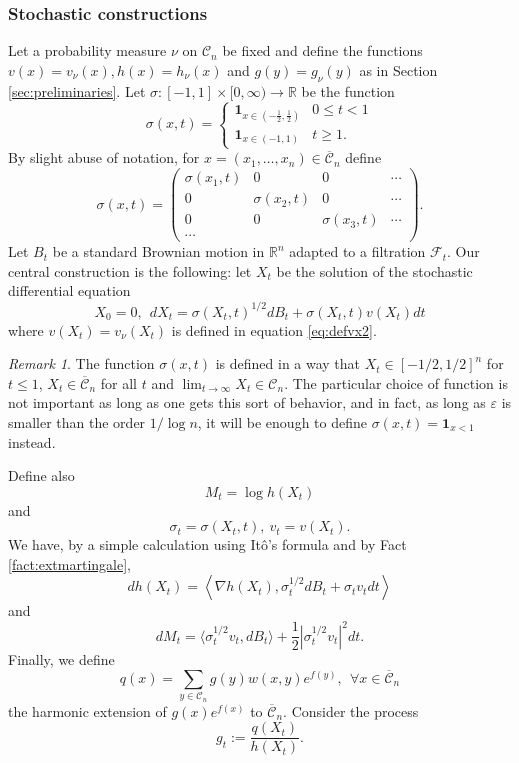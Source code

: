 \documentclass[12pt]{article}
\def \RR {\mathbb R}
\def \CC {\mathbb C}
\def \eps {\varepsilon}
\def \FF {\mathcal{F}}
\def \DC {\mathcal{C}_n}
\def \CC {\overline{\mathcal{C}}_n}
\theoremstyle{definition}
\theoremstyle{remark}
\newtheorem{remark}{Remark}
\begin{document}
\subsubsection{Stochastic constructions} \label{sec:stochastic}
Let a probability measure $\nu$ on $\DC$ be fixed and define the functions $v(x)=v_\nu(x),h(x)=h_\nu(x)$ and $g(y)=g_\nu(y)$ as in Section \ref{sec:preliminaries}. Let $\sigma:[-1,1] \times [0,\infty) \to \RR$ be the function 
$$
\sigma(x,t) = \begin{cases}
\mathbf{1}_{x \in \left (-\tfrac 1 2, \tfrac 1 2 \right )} & 0 \leq t < 1 \\
\mathbf{1}_{x \in (-1,1)} & t \geq 1.
\end{cases}
$$ 
By slight abuse of notation, for $x = (x_1, \dots, x_n) \in \CC$ define 
$$
\sigma(x,t) = \left (\begin{matrix}
\sigma(x_1,t) & 0 & 0 & \cdots \\
0 & \sigma(x_2,t) & 0 & \cdots \\
0 & 0 & \sigma(x_3,t) & \cdots \\
\cdots 
\end{matrix} \right ).
$$
Let $B_t$ be a standard Brownian motion in $\RR^n$ adapted to a filtration $\FF_t$. Our central construction is the following: let $X_t$ be the solution of the stochastic differential equation
\begin{equation}\label{eq:mainsde}
X_0 = 0, ~~ d X_t = \sigma(X_t,t)^{1/2} d B_t + \sigma(X_t,t) v(X_t) dt
\end{equation}
where $v(X_t) = v_\nu(X_t)$ is defined in equation \eqref{eq:defvx2}. 
\begin{remark} 
The function $\sigma(x,t)$ is defined in a way that $X_t \in [-1/2,1/2]^n$ for $t \leq 1$, $X_t \in \CC$ for all $t$ and $\lim_{t \to \infty} X_t \in \DC$. The particular choice of function is not important as long as one gets this sort of behavior, and in fact, as long as $\eps$ is smaller than the order $1/\log n$, it will be enough to define $\sigma(x,t) = \mathbf{1}_{x < 1}$ instead.
\end{remark}
Define also
$$M_t = \log h(X_t)$$
and
$$
\sigma_t = \sigma(X_t,t), ~ v_t = v(X_t).
$$
We have, by a simple calculation using It\^o's formula and by Fact \ref{fact:extmartingale},
$$
d h(X_t) = \left \langle \nabla h(X_t), \sigma_t^{1/2} d B_t + \sigma_t v_t dt \right \rangle
$$
and
\begin{equation}\label{eq:dMt}
d M_t = \langle \sigma_t^{1/2} v_t, d B_t \rangle + \frac{1}{2} |\sigma_t^{1/2} v_t|^2 dt .
\end{equation}
Finally, we define 
$$
q(x) = \sum_{y \in \DC} g(y) w(x,y) e^{f(y)}, ~~ \forall x \in \CC
$$ 
the harmonic extension of $g(x) e^{f(x)}$ to $\CC$. Consider the process
\begin{equation}\label{eq:defgt}
g_t := \frac{q(X_t)}{h(X_t)}.
\end{equation}
\end{document}
